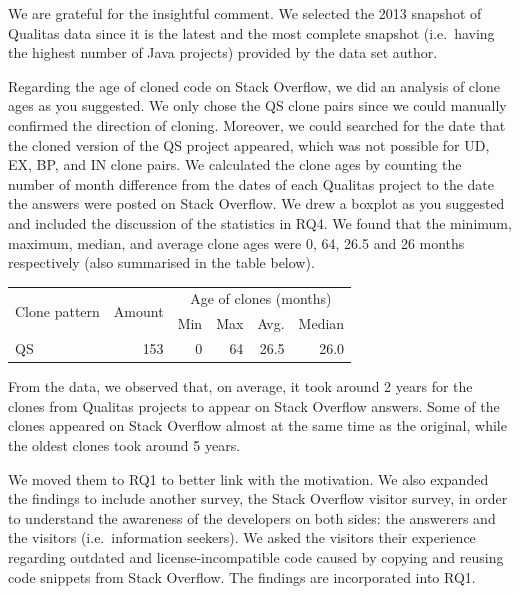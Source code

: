 \documentclass[a4paper,twoside,10pt]{reviewresponse}
\begin{document}
We are grateful for the insightful comment. We selected the 2013 snapshot of Qualitas data since it is the latest and the most complete snapshot (i.e.~having the highest number of Java projects) provided by the data set author. 

Regarding the age of cloned code on Stack Overflow, we did an analysis of clone ages as you suggested. We only chose the QS clone pairs since we could manually confirmed the direction of cloning. Moreover, we could searched for the date that the cloned version of the QS project appeared, which was not possible for UD, EX, BP, and IN clone pairs. 
We calculated the clone ages by counting the number of month difference from the dates of each Qualitas project to the date the answers were posted on Stack Overflow.
We drew a boxplot as you suggested and included the discussion of the statistics in RQ4. We found that the minimum, maximum, median, and average clone ages were 0, 64, 26.5 and 26 months respectively (also summarised in the table below).

\begin{table}[H]
	\centering
\begin{tabular}{lrrrrr}
	\toprule
	\multirow{2}{*}{Clone pattern} & \multirow{2}{*}{Amount} & \multicolumn{4}{c}{Age of clones (months)} \\ \cmidrule{3-6}
	& & Min & Max & Avg. & Median \\
	\midrule
	QS & 153 & 0 & 64 & 26.5 & 26.0 \\
	\bottomrule
\end{tabular}
\end{table}

From the data, we observed that, on average, it took around 2 years for the clones from Qualitas projects to appear on Stack Overflow answers. Some of the clones appeared on Stack Overflow almost at the same time as the original, while the oldest clones took around 5 years.


We moved them to RQ1 to better link with the motivation. We also expanded the findings to include another survey, the Stack Overflow visitor survey, in order to understand the awareness of the developers on both sides: the answerers and the visitors (i.e.~information seekers). We asked the visitors their experience regarding outdated and license-incompatible code caused by copying and reusing code snippets from Stack Overflow. The findings are incorporated into RQ1.
\end{document}
